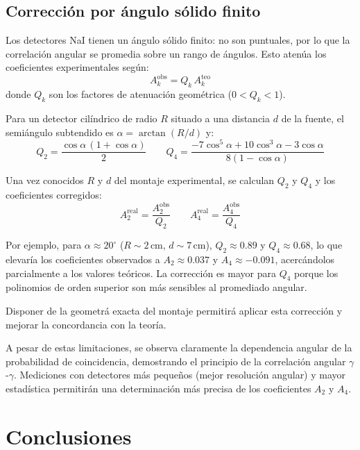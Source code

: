 \documentclass[12pt,a4paper]{article}
\begin{document}
\subsection{Correcci\'on por \'angulo s\'olido finito}

Los detectores NaI tienen un \'angulo s\'olido finito: no son puntuales,
por lo que la correlaci\'on angular se promedia sobre un rango de \'angulos.
Esto aten\'ua los coeficientes experimentales seg\'un:
\begin{equation}
A_k^{\text{obs}} = Q_k \, A_k^{\text{teo}}
\end{equation}
donde $Q_k$ son los factores de atenuaci\'on geom\'etrica ($0 < Q_k < 1$).

Para un detector cil\'indrico de radio $R$ situado a una distancia $d$
de la fuente, el semi\'angulo subtendido es $\alpha = \arctan(R/d)$ y:
\begin{equation}
Q_2 = \frac{\cos\alpha\,(1+\cos\alpha)}{2}
\qquad
Q_4 = \frac{-7\cos^5\alpha + 10\cos^3\alpha - 3\cos\alpha}{8(1-\cos\alpha)}
\end{equation}

Una vez conocidos $R$ y $d$ del montaje experimental, se calculan $Q_2$ y $Q_4$
y los coeficientes corregidos:
\begin{equation}
A_2^{\text{real}} = \frac{A_2^{\text{obs}}}{Q_2}
\qquad
A_4^{\text{real}} = \frac{A_4^{\text{obs}}}{Q_4}
\end{equation}

Por ejemplo, para $\alpha \approx 20^\circ$ ($R \sim 2$\,cm, $d \sim 7$\,cm),
$Q_2 \approx 0.89$ y $Q_4 \approx 0.68$, lo que elevar\'ia los coeficientes
observados a $A_2 \approx 0.037$ y $A_4 \approx -0.091$, acerc\'andolos
parcialmente a los valores te\'oricos. La correcci\'on es mayor para $Q_4$
porque los polinomios de orden superior son m\'as sensibles al promediado
angular.

Disponer de la geometr\'a exacta del montaje permitir\'a aplicar esta
correcci\'on y mejorar la concordancia con la teor\'ia.

A pesar de estas limitaciones, se observa claramente la dependencia angular
de la probabilidad de coincidencia, demostrando el principio de la
correlaci\'on angular $\gamma$-$\gamma$. Mediciones con detectores
m\'as peque\~nos (mejor resoluci\'on angular) y mayor estad\'istica
permitir\'an una determinaci\'on m\'as precisa de los coeficientes
$A_2$ y $A_4$.

\section{Conclusiones}
\end{document}
